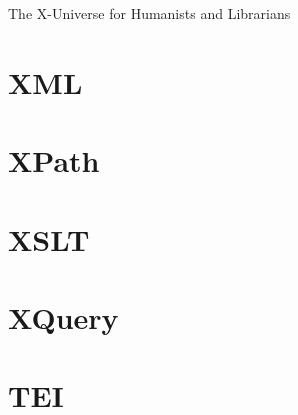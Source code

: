 \documentclass[open=any, index=totoc, paper=167mm:239mm]{scrbook}
\begin{document}
  \frontmatter  
    \thispagestyle{empty}
    \vspace*{\fill}
    \begin{center}The X-Universe for Humanists and Librarians\end{center}
    \vspace*{\fill}

    \tableofcontents

  \mainmatter
    \part{XML}
    

    \part{XPath}

    \part{XSLT}
    

    \part{XQuery}

    \part{TEI}
\end{document}
